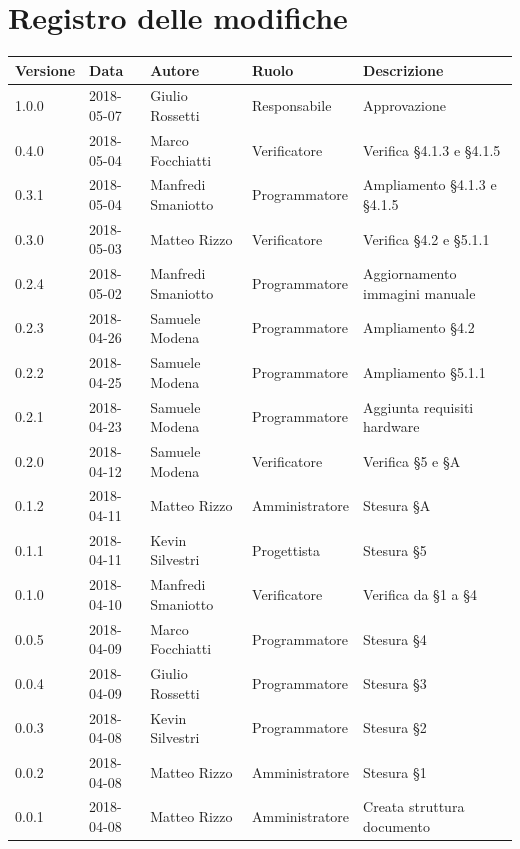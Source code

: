 \documentclass[openany,12pt,a4paper]{report}
\begin{document}
	\chapter*{Registro delle modifiche}
	\setlength\LTleft{-22mm}
	\begin{longtable}{|p{20mm}|p{20mm}|p{40mm}|p{30mm}|p{50mm}|}
		\hline
		\textbf{Versione} & \textbf{Data} & \textbf{Autore} & \textbf{Ruolo} & \textbf{Descrizione} \\

		\hline 1.0.0 & 2018-05-07 & Giulio Rossetti & Responsabile & Approvazione\\
		\hline 0.4.0 & 2018-05-04 & Marco Focchiatti & Verificatore & Verifica §4.1.3 e §4.1.5\\
		\hline 0.3.1 & 2018-05-04 & Manfredi Smaniotto & Programmatore & Ampliamento §4.1.3 e §4.1.5\\
		\hline 0.3.0 & 2018-05-03 & Matteo Rizzo & Verificatore & Verifica §4.2 e §5.1.1\\		
		\hline 0.2.4 & 2018-05-02 & Manfredi Smaniotto & Programmatore & Aggiornamento immagini manuale\\		
		\hline 0.2.3 & 2018-04-26 & Samuele Modena & Programmatore & Ampliamento §4.2\\
		\hline 0.2.2 & 2018-04-25 & Samuele Modena & Programmatore & Ampliamento §5.1.1\\
		\hline 0.2.1 & 2018-04-23 & Samuele Modena & Programmatore & Aggiunta requisiti hardware \\		
		\hline 0.2.0 & 2018-04-12 & Samuele Modena & Verificatore & Verifica §5 e §A\\
		\hline 0.1.2 & 2018-04-11 & Matteo Rizzo & Amministratore & Stesura §A \\	
		\hline 0.1.1 & 2018-04-11 & Kevin Silvestri & Progettista & Stesura §5 \\
		\hline 0.1.0 & 2018-04-10 & Manfredi Smaniotto & Verificatore & Verifica da §1 a §4 \\
		\hline 0.0.5 & 2018-04-09 & Marco Focchiatti & Programmatore & Stesura §4 \\	
		\hline 0.0.4 & 2018-04-09 & Giulio Rossetti & Programmatore & Stesura §3 \\
		\hline 0.0.3 & 2018-04-08 & Kevin Silvestri & Programmatore & Stesura §2 \\
		\hline 0.0.2 & 2018-04-08 & Matteo Rizzo & Amministratore & Stesura §1 \\
		\hline 0.0.1 & 2018-04-08 & Matteo Rizzo & Amministratore & Creata struttura documento \\
		\hline
		
	\end{longtable}
	
\end{document}
